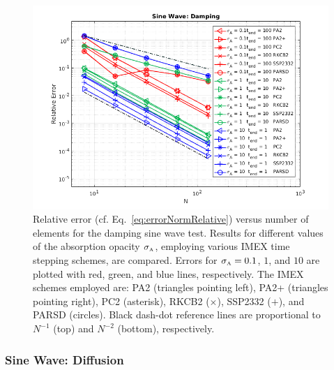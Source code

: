 \begin{figure}[h]
  \centering
    \includegraphics[width=\textwidth]{figures/SineWaveDamping}
   \caption{Relative error (cf. Eq.~\eqref{eq:errorNormRelative}) versus number of elements for the damping sine wave test.  Results for different values of the absorption opacity $\sigma_{\mbox{\tiny A}}$, employing various IMEX time stepping schemes, are compared.  Errors for $\sigma_{\mbox{\tiny A}}=0.1$, $1$, and $10$ are plotted with red, green, and blue lines, respectively.  The IMEX schemes employed are: PA2 (triangles pointing left), PA2+ (triangles pointing right), PC2 (asterisk), RKCB2 ($\times$), SSP2332 ($+$), and PARSD (circles).  Black dash-dot reference lines are proportional to $N^{-1}$ (top) and $N^{-2}$ (bottom), respectively.}
  \label{fig:SineWaveDamping}
\end{figure}

\subsubsection{Sine Wave: Diffusion}

